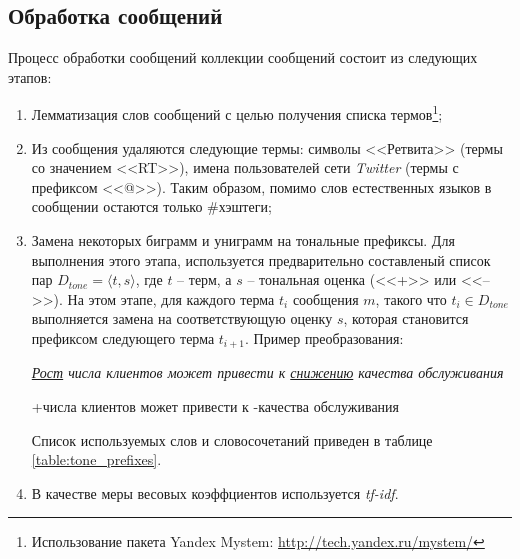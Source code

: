     \subsection{Обработка сообщений}
    \label{sec:buildingMsgProcessing}
    Процесс обработки сообщений коллекции сообщений состоит из следующих этапов:
    \begin{enumerate}
        \item Лемматизация слов сообщений с целью получения списка термов\footnote{
            Использование пакета Yandex Mystem:
            \url{http://tech.yandex.ru/mystem/}
        };

        \item Из сообщения удаляются следующие термы:
            символы <<Ретвита>> (термы со значением <<RT>>),
            имена пользователей сети {\it Twitter} (термы с префиксом <<@>>).
            Таким образом, помимо слов естественных языков в сообщении остаются
            только \#хэштеги;
        \item Замена некоторых биграмм и униграмм на тональные префиксы.
            Для выполнения этого этапа, используется предварительно составленый
            список пар $D_{tone} = {\langle t, s\rangle}$, где $t$ -- терм, а $s$ --
            тональная оценка (<<+>> или <<-->>). На этом этапе, для каждого терма $t_i$
            сообщения $m$, такого что $t_i \in D_{tone}$ выполняется замена на соответствующую
            оценку $s$, которая становится префиксом следующего терма $t_{i+1}$.
            Пример преобразования:
            \begin{center}
                \it
                \underline{Рост} числа клиентов может привести к \underline{снижению} качества обслуживания

                +числа клиентов может привести к -качества обслуживания
            \end{center}

            Список используемых слов и словосочетаний приведен в таблице
            \ref{table:tone_prefixes}.
            

        \item В качестве меры весовых коэффциентов используется {\it tf-idf}.
    \end{enumerate}

